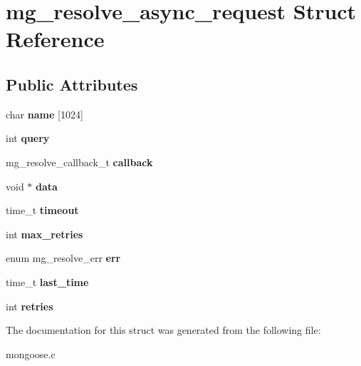 \hypertarget{structmg__resolve__async__request}{}\section{mg\+\_\+resolve\+\_\+async\+\_\+request Struct Reference}
\label{structmg__resolve__async__request}
\subsection*{Public Attributes}
\begin{DoxyCompactItemize}
\item 
\mbox{\label{structmg__resolve__async__request_a3d5bd5daeb6672a070322e3cf304eb75}} 
char {\bfseries name} \mbox{[}1024\mbox{]}
\item 
\mbox{\label{structmg__resolve__async__request_aa7f0cbfc40e85f445d117e5804825dbe}} 
int {\bfseries query}
\item 
\mbox{\label{structmg__resolve__async__request_ae07665c233e6a23b2e87075e325b0cab}} 
mg\+\_\+resolve\+\_\+callback\+\_\+t {\bfseries callback}
\item 
\mbox{\label{structmg__resolve__async__request_aebb9fce193633d8f2112077ad1b39078}} 
void $\ast$ {\bfseries data}
\item 
\mbox{\label{structmg__resolve__async__request_a591efe1d1186694f5a4e91a09c60ec89}} 
time\+\_\+t {\bfseries timeout}
\item 
\mbox{\label{structmg__resolve__async__request_a0586dade9fff37fd19ee9967cf121536}} 
int {\bfseries max\+\_\+retries}
\item 
\mbox{\label{structmg__resolve__async__request_a237f8c5e8a05698a7206dc0098d206f9}} 
enum mg\+\_\+resolve\+\_\+err {\bfseries err}
\item 
\mbox{\label{structmg__resolve__async__request_a8ad1cbe9e2408b224d83e3d43e8e8275}} 
time\+\_\+t {\bfseries last\+\_\+time}
\item 
\mbox{\label{structmg__resolve__async__request_a64cca6891e31a194feb970363f14cd52}} 
int {\bfseries retries}
\end{DoxyCompactItemize}


The documentation for this struct was generated from the following file\+:\begin{DoxyCompactItemize}
\item 
mongoose.\+c\end{DoxyCompactItemize}
